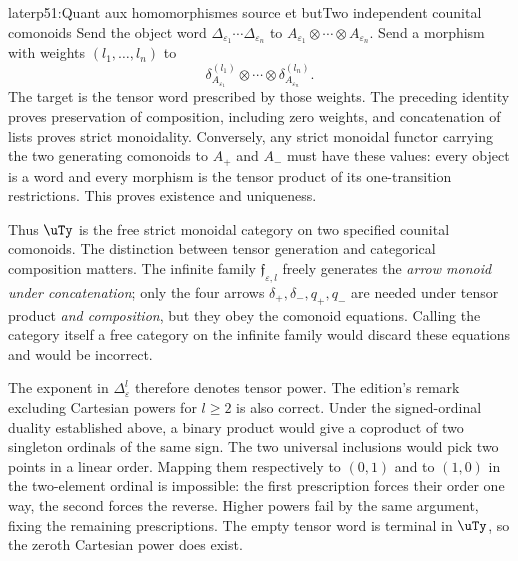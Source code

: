 \begin{dcomment}{later}{p51:Quant aux homomorphismes source et but}{Two independent counital comonoids}
Send the object word $\Delta_{\varepsilon_1}\cdots\Delta_{\varepsilon_n}$ to $A_{\varepsilon_1}\otimes\cdots\otimes A_{\varepsilon_n}$. Send a morphism with weights $(l_1,\ldots,l_n)$ to
\[
 \delta_{A_{\varepsilon_1}}^{(l_1)}\otimes\cdots\otimes
 \delta_{A_{\varepsilon_n}}^{(l_n)}.
\]
The target is the tensor word prescribed by those weights. The preceding identity proves preservation of composition, including zero weights, and concatenation of lists proves strict monoidality. Conversely, any strict monoidal functor carrying the two generating comonoids to $A_+$ and $A_-$ must have these values: every object is a word and every morphism is the tensor product of its one-transition restrictions. This proves existence and uniqueness.

Thus $\uTy$ is the free strict monoidal category on two specified counital comonoids. The distinction between tensor generation and categorical composition matters. The infinite family $\mathfrak f_{\varepsilon,l}$ freely generates the \emph{arrow monoid under concatenation}; only the four arrows $\delta_+,\delta_-,q_+,q_-$ are needed under tensor product \emph{and composition}, but they obey the comonoid equations. Calling the category itself a free category on the infinite family would discard these equations and would be incorrect.

The exponent in $\Delta_\varepsilon^l$ therefore denotes tensor power. The edition's remark excluding Cartesian powers for $l\geq2$ is also correct. Under the signed-ordinal duality established above, a binary product would give a coproduct of two singleton ordinals of the same sign. The two universal inclusions would pick two points in a linear order. Mapping them respectively to $(0,1)$ and to $(1,0)$ in the two-element ordinal is impossible: the first prescription forces their order one way, the second forces the reverse. Higher powers fail by the same argument, fixing the remaining prescriptions. The empty tensor word is terminal in $\uTy$, so the zeroth Cartesian power does exist.
\end{dcomment}

